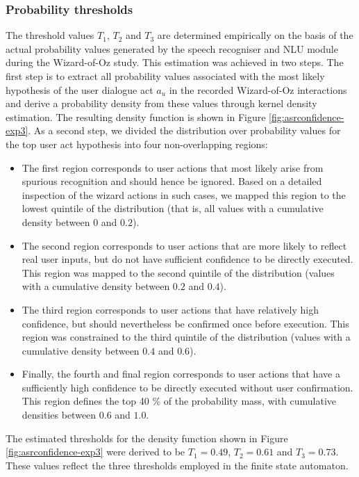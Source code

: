 \subsubsection*{Probability thresholds}

The threshold values $T_1$, $T_2$ and $T_3$ are determined empirically on the basis of the actual probability values generated by the speech recogniser and NLU module during the Wizard-of-Oz study.  This estimation was achieved in two steps.  The first step is to extract all probability values associated with the most likely hypothesis of the user dialogue act $a_u$ in the recorded Wizard-of-Oz interactions and derive a probability density from these values through kernel density estimation. The resulting density function is shown in Figure \ref{fig:asrconfidence-exp3}. As a second step, we divided the distribution over probability values for the top user act hypothesis into four non-overlapping regions:
\begin{itemize}
\item The first region corresponds to user actions that most likely arise from spurious recognition and should hence be ignored. Based on a detailed inspection of the wizard actions in such cases, we mapped this region to the lowest quintile of the distribution (that is, all values with a cumulative density between $0$ and $0.2$). 
\item The second region corresponds to user actions that are more likely to reflect real user inputs, but do not have sufficient confidence to be directly executed.  This region was mapped to the second quintile of the distribution (values with a cumulative density between $0.2$ and $0.4$).
\item The third region corresponds to user actions that have relatively high confidence, but should nevertheless be confirmed once before execution.  This region was constrained to the third quintile of the distribution (values with a cumulative density between $0.4$ and $0.6$).
\item Finally, the fourth and final region corresponds to user actions that have a sufficiently high confidence to be directly executed without user confirmation. This region defines the top 40 \% of the probability mass, with cumulative densities between $0.6$ and $1.0$.
\end{itemize}

The estimated thresholds for the density function shown in Figure \ref{fig:asrconfidence-exp3} were derived to be $T_1 = 0.49$, $T_2 = 0.61$ and $T_3 = 0.73$. These values reflect the three thresholds employed in the finite state automaton. 


